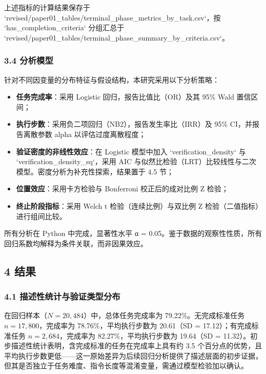 \documentclass[12pt,a4paper,openany,oneside]{ctexrep}
\begin{document}
上述指标的计算结果保存于 `revised/paper01\_tables/terminal\_phase\_metrics\_by\_task.csv`，按 `has\_completion\_criteria` 分组汇总于 `revised/paper01\_tables/terminal\_phase\_summary\_by\_criteria.csv`。

\subsubsection{3.4 分析模型}


针对不同因变量的分布特征与假设结构，本研究采用以下分析策略：

\begin{itemize}
\item \textbf{任务完成率}：采用 Logistic 回归，报告比值比（OR）及其 95\% Wald 置信区间；
\item \textbf{执行步数}：采用负二项回归（NB2），报告发生率比（IRR）及 95\% CI，并报告离散参数 alpha 以评估过度离散程度；
\item \textbf{验证密度的非线性效应}：在 Logistic 模型中加入 `verification\_density` 与 `verification\_density\_sq`，采用 AIC 与似然比检验（LRT）比较线性与二次模型。密度分析为补充性探索，结果置于 4.5 节；
\item \textbf{位置效应}：采用卡方检验与 Bonferroni 校正后的成对比例 Z 检验；
\item \textbf{终止阶段指标}：采用 Welch t 检验（连续比例）与双比例 Z 检验（二值指标）进行组间比较。
\end{itemize}


所有分析在 Python 中完成，显著性水平 α = 0.05。鉴于数据的观察性性质，所有回归系数均解释为条件关联，而非因果效应。

\subsection{4 结果}


\subsubsection{4.1 描述性统计与验证类型分布}


在回归样本（$N=20{,}484$）中，总体任务完成率为 79.22\%。无完成标准任务 $n=17{,}800$，完成率为 78.76\%，平均执行步数为 20.61（SD = 17.12）；有完成标准任务 $n=2{,}684$，完成率为 82.27\%，平均执行步数为 19.64（SD = 11.32）。初步描述性统计表明，含完成标准的任务在完成率上具有约 3.5 个百分点的优势，且平均执行步数更低——这一原始差异为后续回归分析提供了描述层面的初步证据，但其是否独立于任务难度、指令长度等混淆变量，需通过模型检验加以确认。
\end{document}
